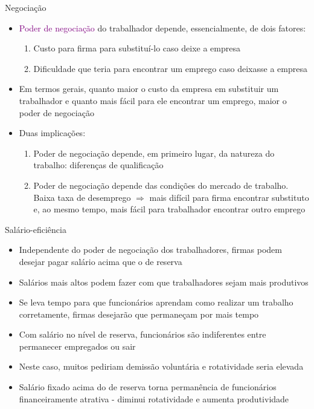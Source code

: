 \documentclass[10pt]{beamer}
\begin{document}
\begin{frame}
    {Negociação}
    \begin{itemize}
        \item \textcolor{purple}{Poder de negociação} do trabalhador depende, essencialmente, de dois fatores:\medskip
        \begin{enumerate}
            \item Custo para firma para substituí-lo caso deixe a empresa\medskip
            \item Dificuldade que teria para encontrar um emprego caso deixasse a empresa\bigskip
        \end{enumerate}
        \item Em termos gerais, quanto maior o custo da empresa em substituir um trabalhador e quanto mais fácil para ele encontrar um emprego, maior o poder de negociação\bigskip
        \item Duas implicações:\medskip
        \begin{enumerate}
            \item Poder de negociação depende, em primeiro lugar, da natureza do trabalho: diferenças de qualificação\medskip
            \item Poder de negociação depende das condições do mercado de trabalho. Baixa taxa de desemprego $\Rightarrow$ mais difícil para firma encontrar substituto e, ao mesmo tempo, mais fácil para trabalhador encontrar outro emprego
        \end{enumerate}
    \end{itemize}
\end{frame}

\begin{frame}
    {Salário-eficiência}
    \begin{itemize}
        \item Independente do poder de negociação dos trabalhadores, firmas podem desejar pagar salário acima que o de reserva\bigskip
        \item Salários mais altos podem fazer com que trabalhadores sejam mais produtivos\bigskip
        \item Se leva tempo para que funcionários aprendam como realizar um trabalho corretamente, firmas desejarão que permaneçam por mais tempo\bigskip
        \item Com salário no nível de reserva, funcionários são indiferentes entre permanecer empregados ou sair\bigskip
        \item Neste caso, muitos pediriam demissão voluntária e rotatividade seria elevada\bigskip
        \item Salário fixado acima do de reserva torna permanência de funcionários financeiramente atrativa - diminui rotatividade e aumenta produtividade
    \end{itemize}
\end{frame}
\end{document}
